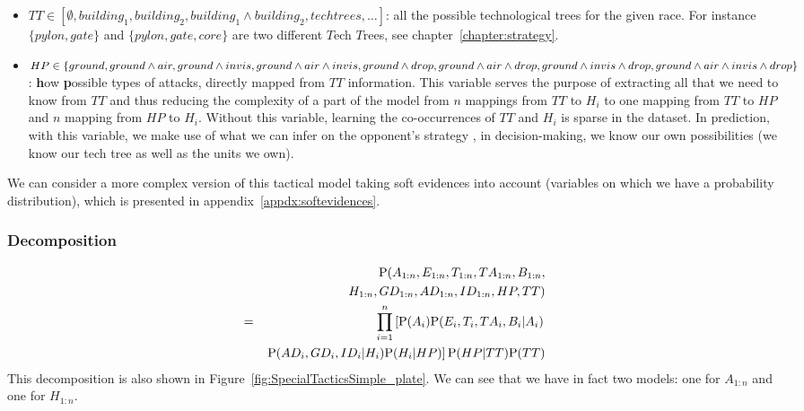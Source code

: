 \begin{itemize}
    \item $TT \in [\emptyset, building_1, building_2, building_1\wedge building_2, techtrees, \dots]$: all the possible technological trees for the given race. For instance $\{pylon, gate\}$ and $\{pylon, gate, core\}$ are two different $T$ech $T$rees, see chapter~\ref{chapter:strategy}.
    \item $HP \in \begin{small}\{ground, ground\wedge air, ground\wedge invis, ground\wedge air\wedge invis, ground\wedge drop, ground\wedge air\wedge drop, ground\wedge invis\wedge drop, ground\wedge air\wedge invis\wedge drop\}\end{small}$: \textbf{h}ow \textbf{p}ossible types of attacks, directly mapped from $TT$ information. This variable serves the purpose of extracting all that we need to know from $TT$ and thus reducing the complexity of a part of the model from $n$ mappings from $TT$ to $H_i$ to one mapping from $TT$ to $HP$ and $n$ mapping from $HP$ to $H_i$. Without this variable, learning the co-occurrences of $TT$ and $H_i$ is sparse in the dataset. In prediction, with this variable, we make use of what we can infer on the opponent's strategy \cite{SYNNAEVE:OpeningPred,SYNNAEVE:StratPred}, in decision-making, we know our own possibilities (we know our tech tree as well as the units we own).
\end{itemize}
We can consider a more complex version of this tactical model taking soft evidences into account (variables on which we have a probability distribution), which is presented in appendix~\ref{appdx:softevidences}.

\subsubsection{Decomposition}
\label{sec:tacticaldecomposition}
\begin{eqnarray}
    & & \mathrm{P}(A_{1:n}, E_{1:n}, T_{1:n}, TA_{1:n}, B_{1:n}, \\
& & H_{1:n}, GD_{1:n}, AD_{1:n}, ID_{1:n}, HP, TT) \\
    & = & \prod_{i=1}^n \left[\mathrm{P}(A_i)\mathrm{P}(E_i,T_i,TA_i,B_i|A_i) \label{eqn:tacticsdecomposition}\right.\\
& & \left. \mathrm{P}(AD_i,GD_i,ID_i|H_i)\mathrm{P}(H_i|HP)\right]\mathrm{P}(HP|TT)\mathrm{P}(TT)
\end{eqnarray}
This decomposition is also shown in Figure~\ref{fig:SpecialTacticsSimple_plate}. We can see that we have in fact two models: one for $A_{1:n}$ and one for $H_{1:n}$.

